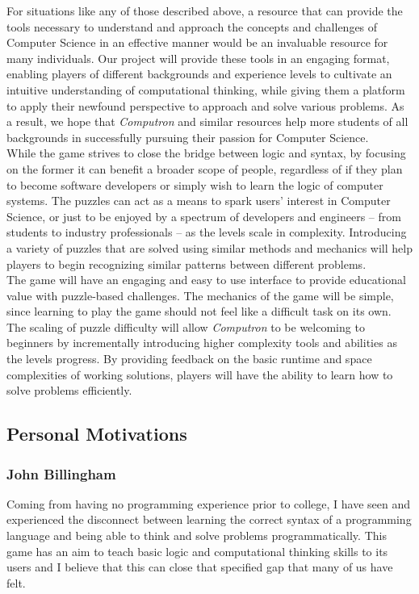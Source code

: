 For situations like any of those described above, a resource that can provide
the tools necessary to understand and approach the concepts and challenges of
Computer Science in an effective manner would be an invaluable resource for many
individuals. Our project will provide these tools in an engaging format,
enabling players of different backgrounds and experience levels to cultivate an
intuitive understanding of computational thinking, while giving them a platform
to apply their newfound perspective to approach and solve various problems. As a
result, we hope that \textit{Computron} and similar resources help more students of all
backgrounds in successfully pursuing their passion for Computer Science.\\

While the game strives to close the bridge between logic and syntax, by focusing
on the former it can benefit a broader scope of people, regardless of if they
plan to become software developers or simply wish to learn the logic of
computer systems. The puzzles can act as a means to spark users’ interest in
Computer Science, or just to be enjoyed by a spectrum of developers and
engineers -- from students to industry professionals -- as the levels scale in 
complexity. Introducing a variety of puzzles that are solved using similar methods 
and mechanics will help players to begin recognizing similar patterns between 
different problems.\\

The game will have an engaging and easy to use interface to provide educational
value with puzzle-based challenges. The mechanics of the game will be simple, since 
learning to play the game should not feel like a difficult task on its own. The scaling 
of puzzle difficulty will allow \textit{Computron} to be welcoming to beginners by 
incrementally introducing higher complexity tools and abilities as the levels progress. 
By providing feedback on the basic runtime and space complexities of working 
solutions, players will have the ability to learn how to solve problems efficiently.\\

\subsection{Personal Motivations}
\subsubsection{John Billingham}
Coming from having no programming experience prior to college, I have seen and
experienced the disconnect between learning the correct syntax of a programming
language and being able to think and solve problems programmatically. This game
has an aim to teach basic logic and computational thinking skills to its users
and I believe that this can close that specified gap that many of us have felt.

